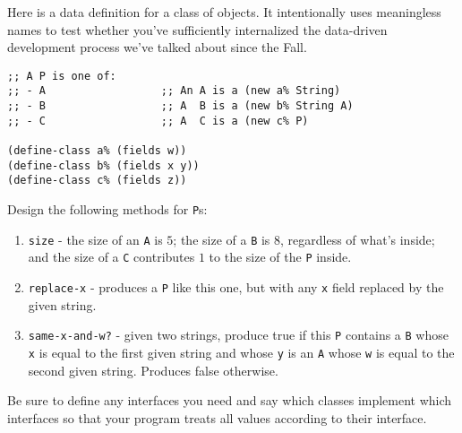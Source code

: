 \documentclass[12pt]{article}                   %
\def\pts#1{\marginpar{\footnotesize \raggedright  \fbox{#1 {\sc Points}}}}
\begin{document}
\vfill\thispagestyle{empty}
\newpage

\fi






\begin{problem}\pts{18} %

Here is a data definition for a class of objects.  It intentionally
uses meaningless names to test whether you've sufficiently
internalized the data-driven development process we've talked about
since the Fall.

\begin{verbatim}
;; A P is one of:          
;; - A                  ;; An A is a (new a% String)
;; - B                  ;; A  B is a (new b% String A)
;; - C                  ;; A  C is a (new c% P)

(define-class a% (fields w))
(define-class b% (fields x y))
(define-class c% (fields z))
\end{verbatim}

\noindent
Design the following methods for \verb|P|s:

\begin{enumerate}

\item \verb|size| - the size of an \verb|A| is $5$; the size of a
  \verb|B| is $8$, regardless of what's inside; and the size of a
  \verb|C| contributes $1$ to the size of the \verb|P| inside.

\item \verb|replace-x| - produces a \verb|P| like this one, but
  with any \verb|x| field replaced by the given string.

\item \verb|same-x-and-w?| - given two strings, produce true if this
  \verb|P| contains a \verb|B| whose \verb|x| is equal to the
  first given string and whose \verb|y| is an \verb|A| whose
  \verb|w| is equal to the second given string.  Produces false
  otherwise.

\end{enumerate}

Be sure to define any interfaces you need and say which classes
implement which interfaces so that your program treats all values
according to their interface.


\end{problem}
\end{document}
